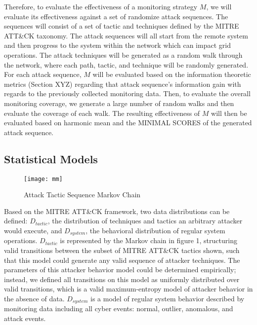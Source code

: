\documentclass[journal]{IEEEtran}
\begin{document}
Therefore, to evaluate the effectiveness of a monitoring strategy \color{red}$M$\color{black}, we will evaluate its effectiveness against a set of randomize attack sequences. The sequences will consist of a set of tactic and techniques defined by the MITRE ATT\&CK taxonomy. The attack sequences will all start from the remote system and then progress to the system within the network which can impact grid operations. The attack techniques will be generated as a random walk through the network, where each path, tactic, and technique will be randomly generated. For each attack sequence, 
\color{red}$M$\color{black} will be evaluated based on the information theoretic metrics \color{red}(Section XYZ)\color{black} regarding that attack sequence's information gain with regards to the previously collected monitoring data. Then, to evaluate the overall monitoring coverage, we  generate a large number of random walks and then evaluate the coverage of each walk. The resulting effectiveness of \color{red}$M$\color{black} will then be evaluated based on \color{red} harmonic mean \color{black} and the \color{red} MINIMAL SCORES \color{black} of the generated attack sequence. 



\subsection{Statistical Models}


\begin{figure}
  \caption{Attack Tactic Sequence Markov Chain}
  \centering
  \texttt{[image: mm]}
  \label{markov}
\end{figure}

\color{red}
Based on the MITRE ATT\&CK framework, two data distributions can be defined: $D_{tactic}$, the distribution of techniques and tactics an arbitrary attacker would execute, and $D_{system}$, the behavioral distribution of regular system operations. $D_{tactic}$ is represented by the Markov chain in figure 1, structuring valid transitions between the subset of MITRE ATT\&CK tactics shown, such that this model could generate any valid sequence of attacker techniques. The parameters of this attacker behavior model could be determined empirically; instead, we defined all transitions on this model as uniformly distributed over valid transitions, which is a valid maximum-entropy model of attacker behavior in the absence of data. $D_{system}$ is a model of regular system behavior described by monitoring data including all cyber events: normal, outlier, anomalous, and attack events.
\end{document}
